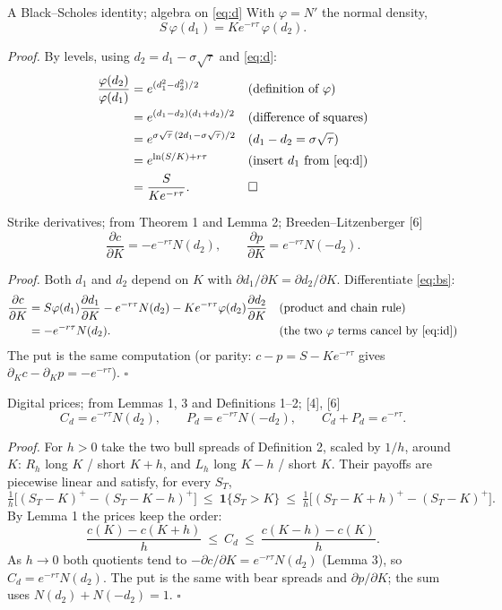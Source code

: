 \documentclass[11pt,a4paper]{article}
\newcommand{\ind}{\mathbf{1}}
\newcommand{\DF}{e^{-r\tau}}
\newcommand{\pos}[1]{\left(#1\right)^{+}}
\begin{document}
\begin{lembox}{A Black--Scholes identity; algebra on \eqref{eq:d}}
With $\varphi=N'$ the normal density,
\begin{equation}\label{eq:id}
S\,\varphi(d_1)=K\DF\,\varphi(d_2).
\end{equation}
\end{lembox}
\noindent\emph{Proof.} By levels, using $d_2=d_1-\sigma\sqrt\tau$ and \eqref{eq:d}:
\begin{align*}
\frac{\varphi(d_2)}{\varphi(d_1)}&=e^{(d_1^2-d_2^2)/2} && \text{(definition of $\varphi$)}\\
&=e^{(d_1-d_2)(d_1+d_2)/2} && \text{(difference of squares)}\\
&=e^{\sigma\sqrt\tau\,(2d_1-\sigma\sqrt\tau)/2} && \text{($d_1-d_2=\sigma\sqrt\tau$)}\\
&=e^{\ln(S/K)+r\tau} && \text{(insert $d_1$ from \eqref{eq:d})}\\
&=\frac{S}{K\DF}. && \hfill\square
\end{align*}

\begin{lembox}{Strike derivatives; from Theorem 1 and Lemma 2; Breeden--Litzenberger [6]}
\begin{equation}\label{eq:dK}
\frac{\partial c}{\partial K}=-\DF N(d_2),\qquad \frac{\partial p}{\partial K}=\DF N(-d_2).
\end{equation}
\end{lembox}
\noindent\emph{Proof.} Both $d_1$ and $d_2$ depend on $K$ with $\partial d_1/\partial K=\partial d_2/\partial K$. Differentiate \eqref{eq:bs}:
\begin{align*}
\frac{\partial c}{\partial K}&=S\varphi(d_1)\frac{\partial d_1}{\partial K}-\DF N(d_2)-K\DF\varphi(d_2)\frac{\partial d_2}{\partial K} && \text{(product and chain rule)}\\
&=-\DF N(d_2). && \text{(the two $\varphi$ terms cancel by \eqref{eq:id})}
\end{align*}
The put is the same computation (or parity: $c-p=S-K\DF$ gives $\partial_K c-\partial_K p=-\DF$). \hfill$\square$

\begin{lembox}{Digital prices; from Lemmas 1, 3 and Definitions 1--2; [4], [6]}
\begin{equation}\label{eq:digprice}
C_d=\DF N(d_2),\qquad P_d=\DF N(-d_2),\qquad C_d+P_d=\DF .
\end{equation}
\end{lembox}
\noindent\emph{Proof.} For $h>0$ take the two bull spreads of Definition 2, scaled by $1/h$, around $K$: $R_h$ long $K$ / short $K+h$, and $L_h$ long $K-h$ / short $K$. Their payoffs are piecewise linear and satisfy, for every $S_T$,
\[
\tfrac1h\bigl[\pos{S_T-K}-\pos{S_T-K-h}\bigr]\ \le\ \ind\{S_T>K\}\ \le\ \tfrac1h\bigl[\pos{S_T-K+h}-\pos{S_T-K}\bigr].
\]
By Lemma 1 the prices keep the order:
\[
\frac{c(K)-c(K+h)}{h}\ \le\ C_d\ \le\ \frac{c(K-h)-c(K)}{h}.
\]
As $h\to0$ both quotients tend to $-\partial c/\partial K=\DF N(d_2)$ (Lemma 3), so $C_d=\DF N(d_2)$. The put is the same with bear spreads and $\partial p/\partial K$; the sum uses $N(d_2)+N(-d_2)=1$. \hfill$\square$
\end{document}
